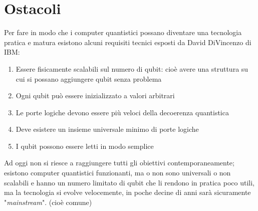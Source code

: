 \section{Ostacoli}
Per fare in modo che i computer quantistici possano diventare una tecnologia pratica e matura esistono alcuni requisiti tecnici esposti da David DiVincenzo di IBM:
\begin{enumerate}
\item Essere fisicamente scalabili sul numero di qubit: cioè avere una struttura su cui si possano aggiungere qubit senza problema
\item Ogni qubit può essere inizializzato a valori arbitrari
\item Le porte logiche devono essere più veloci della decoerenza quantistica
\item Deve esistere un insieme universale minimo di porte logiche
\item I qubit possono essere letti in modo semplice
\end{enumerate}
Ad oggi non si riesce a raggiungere tutti gli obiettivi contemporaneamente; esistono computer quantistici funzionanti, ma o non sono universali o non scalabili e hanno un numero limitato di qubit che li rendono in pratica poco utili, ma la tecnologia si evolve velocemente, in poche decine di anni sarà sicuramente "\textit{mainstream}". (cioè comune)
